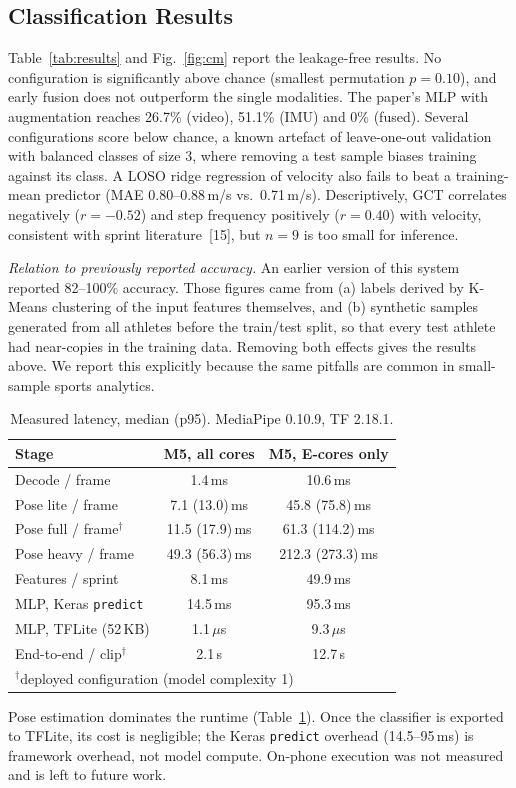 \subsection{Classification Results}
Table~\ref{tab:results} and Fig.~\ref{fig:cm} report the leakage-free results.
No configuration is significantly above chance (smallest permutation
$p=0.10$), and early fusion does not outperform the single modalities. The
paper's MLP with augmentation reaches 26.7\% (video), 51.1\% (IMU) and 0\%
(fused). Several configurations score below chance, a known artefact of
leave-one-out validation with balanced classes of size 3, where removing a
test sample biases training against its class. A LOSO ridge regression of
velocity also fails to beat a training-mean predictor (MAE 0.80--0.88\,m/s
vs.\ 0.71\,m/s). Descriptively, GCT correlates negatively ($r=-0.52$) and step
frequency positively ($r=0.40$) with velocity, consistent with sprint
literature~[15], but $n=9$ is too small for inference.

\emph{Relation to previously reported accuracy.} An earlier version of this
system reported 82--100\% accuracy. Those figures came from (a) labels derived
by K-Means clustering of the input features themselves, and (b) synthetic
samples generated from all athletes before the train/test split, so that every
test athlete had near-copies in the training data. Removing both effects gives
the results above. We report this explicitly because the same pitfalls are
common in small-sample sports analytics.

\begin{table}[t]
\caption{Measured latency, median (p95). MediaPipe 0.10.9, TF 2.18.1.}
\label{tab:latency}
\centering
\begin{tabular}{lcc}
\hline
Stage & M5, all cores & M5, E-cores only \\
\hline
Decode / frame & 1.4\,ms & 10.6\,ms \\
Pose lite / frame & 7.1 (13.0)\,ms & 45.8 (75.8)\,ms \\
Pose full / frame$^\dagger$ & 11.5 (17.9)\,ms & 61.3 (114.2)\,ms \\
Pose heavy / frame & 49.3 (56.3)\,ms & 212.3 (273.3)\,ms \\
Features / sprint & 8.1\,ms & 49.9\,ms \\
MLP, Keras \texttt{predict} & 14.5\,ms & 95.3\,ms \\
MLP, TFLite (52\,KB) & 1.1\,$\mu$s & 9.3\,$\mu$s \\
End-to-end / clip$^\dagger$ & 2.1\,s & 12.7\,s \\
\hline
\multicolumn{3}{l}{$^\dagger$deployed configuration (model complexity 1)}
\end{tabular}
\end{table}
Pose estimation dominates the runtime (Table~\ref{tab:latency}). Once the
classifier is exported to TFLite, its cost is negligible; the Keras
\texttt{predict} overhead (14.5--95\,ms) is framework overhead, not model
compute. On-phone execution was not measured and is left to future work.

